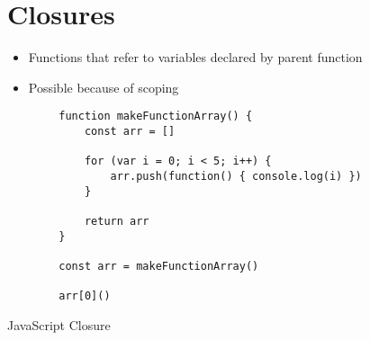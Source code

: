 \section{Closures}
\begin{itemize}
	\item Functions that refer to variables declared by parent function
	\item Possible because of scoping
\end{itemize}

\begin{code}
	\begin{verbatim}
		function makeFunctionArray() {
			const arr = []

			for (var i = 0; i < 5; i++) {
				arr.push(function() { console.log(i) })
			}

			return arr
		}

		const arr = makeFunctionArray()

		arr[0]()
	\end{verbatim}
	\caption{JavaScript Closure}
\end{code}